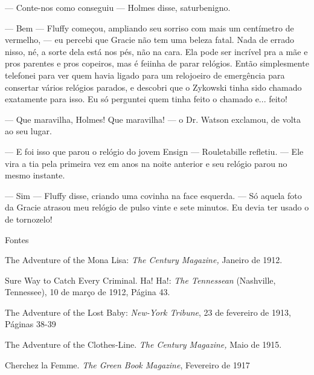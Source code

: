 --- Conte-nos como conseguiu --- Holmes disse, saturbenigno.

--- Bem --- Fluffy começou, ampliando seu sorriso com mais um centímetro
de vermelho, --- eu percebi que Gracie não tem uma beleza fatal. Nada de
errado nisso, né, a sorte dela está nos pés, não na cara. Ela pode ser
incrível pra a mãe e pros parentes e pros copeiros, mas é feiinha de
parar relógios. Então simplesmente telefonei para ver quem havia ligado
para um relojoeiro de emergência para consertar vários relógios parados,
e descobri que o Zykowski tinha sido chamado exatamente para isso. Eu só
perguntei quem tinha feito o chamado e... feito!

--- Que maravilha, Holmes! Que maravilha! --- o Dr. Watson exclamou, de
volta ao seu lugar.

--- E foi isso que parou o relógio do jovem Ensign --- Rouletabille
refletiu. --- Ele vira a tia pela primeira vez em anos na noite anterior
e seu relógio parou no mesmo instante.

--- Sim --- Fluffy disse, criando uma covinha na face esquerda. --- Só
aquela foto da Gracie atrasou meu relógio de pulso vinte e sete minutos.
Eu devia ter usado o de tornozelo!

Fontes

The Adventure of the Mona Lisa: \emph{The Century Magazine,} Janeiro de
1912.

Sure Way to Catch Every Criminal. Ha! Ha!: \emph{The Tennessean}
(Nashville, Tennessee), 10 de março de 1912, Página 43.

The Adventure of the Lost Baby: \emph{New-York Tribune}, 23 de fevereiro
de 1913, Páginas 38-39

The Adventure of the Clothes-Line. \emph{The Century Magazine,} Maio de
1915.

Cherchez la Femme. \emph{The Green Book Magazine}, Fevereiro de 1917
